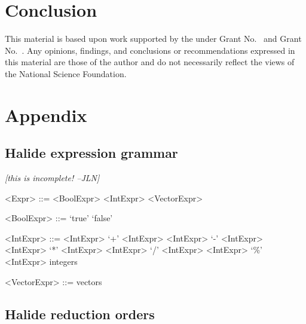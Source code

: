 \documentclass[sigplan,review,anonymous]{acmart}\settopmatter{printfolios=true,printccs=false,printacmref=false}
\newcommand{\jln}[1]{\textcolor{uwpurple}{\textit{[{#1} --JLN]}}}
\begin{document}
\section{Conclusion}


\begin{acks}                            %
  This material is based upon work supported by the
   under Grant
  No.~ and Grant
  No.~.  Any opinions, findings, and
  conclusions or recommendations expressed in this material are those
  of the author and do not necessarily reflect the views of the
  National Science Foundation.
\end{acks}





\appendix
\section{Appendix}

\subsection{Halide expression grammar}
\label{ss:appendixA}

\jln{this is incomplete!}

\begin{grammar}
<Expr> ::= <BoolExpr> 
\alt <IntExpr> 
\alt <VectorExpr>

<BoolExpr> ::= `true'
\alt `false'

<IntExpr> ::= <IntExpr> `+' <IntExpr>
\alt <IntExpr> `-' <IntExpr>
\alt <IntExpr> `*' <IntExpr>
\alt <IntExpr> `/' <IntExpr>
\alt <IntExpr> `\%' <IntExpr>
\alt integers

<VectorExpr> ::= vectors
\end{grammar}

\subsection{Halide reduction orders}
\end{document}
